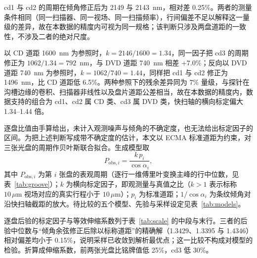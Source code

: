 \documentclass[12pt,a4paper,fontset=windows]{ctexart}
\begin{document}
cd1 与 cd2 的周期在倾角修正后为 2149 与 2143~nm，相对差 0.25\%。两者的测量条件相同（同一扫描器、同一视场、同一扫描频率），行间偏差不足以解释这一量级的差异，故在本数据的精度内可视为同一规格；该判断只涉及两盘道距的一致性，不涉及二者的绝对尺度。

以 CD 道距 1600~nm 为参照时，$k=2146/1600=1.34$，同一因子把 cd3 的周期修正为 $1062/1.34=792$~nm，与 DVD 道距 740~nm 相差 $+7.0\%$；反向以 DVD 道距 740~nm 为参照时，$k=1062/740=1.44$，同样把 cd1 与 cd2 修正为 1496~nm，比 CD 道距低 6.5\%。两种参照下的残余差异同为 7\% 量级，与探针在沟槽边缘的卷积、扫描器非线性以及盘片道距公差相当，故在本数据的精度内，数据支持的组合为 cd1、cd2 属 CD 类、cd3 属 DVD 类，快扫轴的横向标定偏大 1.34--1.44 倍。

逐盘比值由手算给出，未计入观测噪声与倾角的不确定度，也无法给出标定因子的区间。为把上述判断写成带不确定度的估计，本文以 ECMA 标准道距为约束，对三张光盘的周期作贝叶斯联合拟合。生成模型取
\begin{equation}
P_{\text{obs},i}=\frac{k\,p_i}{\cos\alpha_i},
\label{eq:scale}
\end{equation}
其中 $P_{\text{obs},i}$ 为第 $i$ 张盘的表观周期（逐行一维傅里叶变换主峰的行中位数，见表~\ref{tab:groove}）；$k$ 为横向标定因子，即观测量与真值之比（$k>1$ 表示标称 $10\,\mu\mathrm{m}$ 视场对应的真实行程小于 $10\,\mu\mathrm{m}$）；$p_i$ 为标准道距；$1/\cos\alpha_i$ 为条纹倾角对沿快扫轴截距的放大。待比较的五个模型、先验与采样设定见表~\ref{tab:models}。

逐盘后验的标定因子与等效伸缩系数列于表~\ref{tab:scale} 的中段与末行。三者的后验中位数与“倾角余弦修正后除以标称道距”的精确解（1.3429、1.3395 与 1.4346）相对偏差均小于 0.15\%，说明采样已收敛到解析最优点；这一比较不构成对模型的检验。折算成伸缩系数，前两张光盘比铭牌值低 25\%，cd3 低 30\%。
\end{document}
